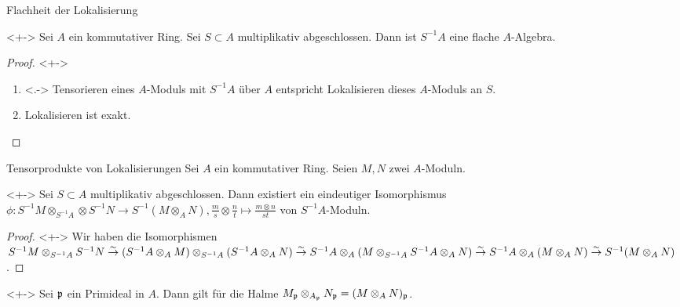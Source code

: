 \begin{frame}{Flachheit der Lokalisierung}
	\begin{proposition}<+->
		Sei \(A\) ein kommutativer Ring. Sei \(S \subset A\) multiplikativ abgeschlossen. Dann ist
		\(S^{-1} A\) eine flache \(A\)-Algebra.
	\end{proposition}
	\begin{proof}<+->
		\begin{enumerate}[<+->]
		\item<.->
			Tensorieren eines \(A\)-Moduls mit \(S^{-1} A\) über \(A\) entspricht Lokalisieren dieses \(A\)-Moduls an \(S\).
		\item
			Lokalisieren ist exakt.
			\qedhere
		\end{enumerate}
	\end{proof}
\end{frame}

\begin{frame}{Tensorprodukte von Lokalisierungen}
	Sei \(A\) ein kommutativer Ring. Seien \(M, N\) zwei \(A\)-Moduln. 
	\begin{proposition}<+->
		Sei \(S \subset A\) multiplikativ abgeschlossen. Dann existiert ein eindeutiger Isomorphismus
		\(\phi\colon S^{-1} M \otimes_{S^{-1} A} \otimes S^{-1} N \to S^{-1} (M \otimes_A N),
		\frac m s \otimes \frac n t \mapsto \frac{m \otimes n}{st}\)
		von \(S^{-1} A\)-Moduln.
	\end{proposition}
	\begin{proof}<+->
		Wir haben die Isomorphismen
		\(S^{-1} M \otimes_{S^{-1} A} S^{-1} N \stackrel\sim\to (S^{-1} A \otimes_A M) \otimes_{S^{-1} A} (S^{-1} A \otimes_A N)
		\stackrel\sim\to S^{-1} A \otimes_A (M \otimes_{S^{-1} A} S^{-1} A \otimes_A N)
		\stackrel\sim\to S^{-1} A \otimes_A (M \otimes_A N) \stackrel\sim\to S^{-1} (M \otimes_A N)\).
	\end{proof}
	\begin{example}<+->
		Sei \(\mathfrak{p}\) ein Primideal in \(A\). Dann gilt für die Halme \(M_{\mathfrak{p}} \otimes_{A_{\mathfrak{p}}}
		N_{\mathfrak{p}} = (M \otimes_A N)_{\mathfrak{p}}\).
	\end{example}
\end{frame}

